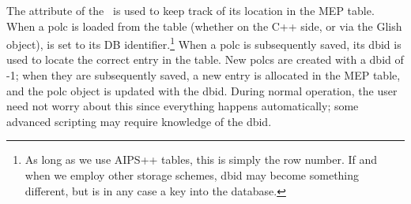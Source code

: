   The  attribute of the \Polc\ is used to keep track of its
  location in the MEP table. When a polc is loaded from the table (whether on
  the C++ side, or via the Glish  object),  is
  set to its DB identifier.\footnote{As long as we use AIPS++ tables, this is
  simply the row number. If and when we employ other storage schemes, dbid  may
  become something different, but is in any case a key into the database.} 
  When a polc is subsequently saved, its dbid is used to locate the correct
  entry in the table. New polcs are created with a dbid of -1; when they are
  subsequently saved, a new entry is allocated in the MEP table, and the polc
  object is updated with the dbid. During normal operation, the user need not
  worry about this since everything happens automatically; some advanced
  scripting may require knowledge of the dbid.


